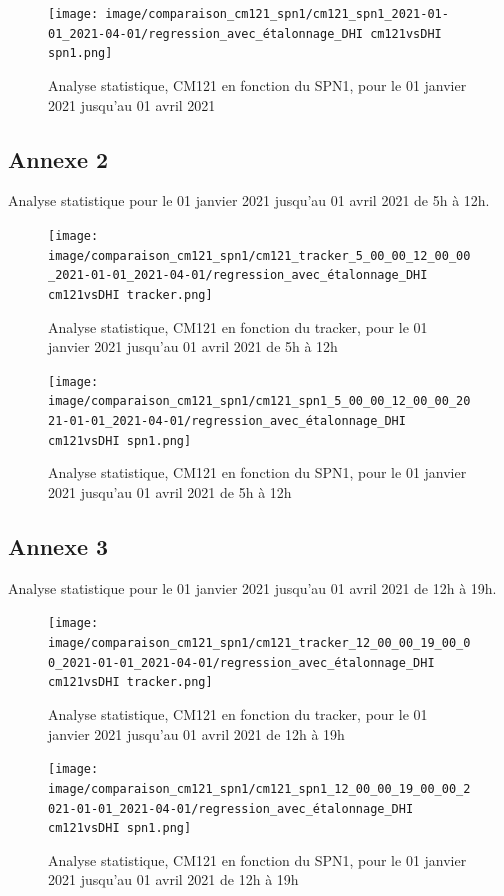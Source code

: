\documentclass[12pt,a4paper]{article}
\begin{document}
\begin{flushleft}
\begin{figure}[H]
\centering
\texttt{[image: image/comparaison\_cm121\_spn1/cm121\_spn1\_2021-01-01\_2021-04-01/regression\_avec\_étalonnage\_DHI cm121vsDHI spn1.png]}  
\caption{Analyse statistique, CM121 en fonction du SPN1, pour le 01 janvier 2021 jusqu'au 01 avril 2021} 
\end{figure}

\newpage

\subsection*{Annexe 2}
Analyse statistique pour le 01 janvier 2021 jusqu'au 01 avril 2021 de 5h à 12h.

\begin{figure}[H]
\centering
\texttt{[image: image/comparaison\_cm121\_spn1/cm121\_tracker\_5\_00\_00\_12\_00\_00\_2021-01-01\_2021-04-01/regression\_avec\_étalonnage\_DHI cm121vsDHI tracker.png]}  
\caption{Analyse statistique, CM121 en fonction du tracker,  pour le 01 janvier 2021 jusqu'au 01 avril 2021 de 5h à 12h}
\end{figure}

\begin{figure}[H]
\centering
\texttt{[image: image/comparaison\_cm121\_spn1/cm121\_spn1\_5\_00\_00\_12\_00\_00\_2021-01-01\_2021-04-01/regression\_avec\_étalonnage\_DHI cm121vsDHI spn1.png]}  
\caption{Analyse statistique, CM121 en fonction du SPN1,  pour le 01 janvier 2021 jusqu'au 01 avril 2021 de 5h à 12h}  
\end{figure}

\newpage
\subsection*{Annexe 3}
Analyse statistique pour le 01 janvier 2021 jusqu'au 01 avril 2021 de 12h à 19h.


\begin{figure}[H]
\centering
\texttt{[image: image/comparaison\_cm121\_spn1/cm121\_tracker\_12\_00\_00\_19\_00\_00\_2021-01-01\_2021-04-01/regression\_avec\_étalonnage\_DHI cm121vsDHI tracker.png]} 
\caption{Analyse statistique, CM121 en fonction du tracker, pour le 01 janvier 2021 jusqu'au 01 avril 2021 de 12h à 19h}    
\end{figure}

\begin{figure}[H]
\centering
\texttt{[image: image/comparaison\_cm121\_spn1/cm121\_spn1\_12\_00\_00\_19\_00\_00\_2021-01-01\_2021-04-01/regression\_avec\_étalonnage\_DHI cm121vsDHI spn1.png]}  
\caption{Analyse statistique, CM121 en fonction du SPN1, pour le 01 janvier 2021 jusqu'au 01 avril 2021 de 12h à 19h}   
\end{figure}




\end{flushleft}






\end{document}
